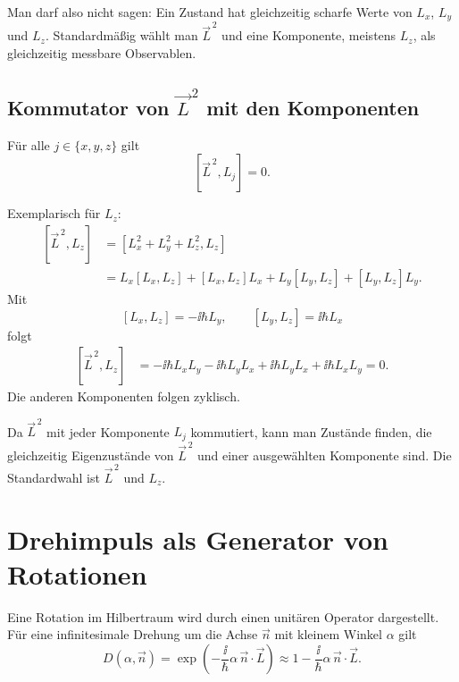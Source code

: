 \begin{warningbox}
Man darf also nicht sagen: Ein Zustand hat gleichzeitig scharfe Werte von \(L_x\), \(L_y\) und \(L_z\). Standardmäßig wählt man \(\vec L^{\,2}\) und eine Komponente, meistens \(L_z\), als gleichzeitig messbare Observablen.
\end{warningbox}

\subsection{Kommutator von \(\vec L^{\,2}\) mit den Komponenten}

\begin{satzbox}
Für alle \(j\in\{x,y,z\}\) gilt
\[
    [\vec L^{\,2},L_j]=0.
\]
\end{satzbox}

\begin{proofbox}
Exemplarisch für \(L_z\):
\[
\begin{aligned}
    [\vec L^{\,2},L_z]
    &= [L_x^2+L_y^2+L_z^2,L_z]\\
    &= L_x[L_x,L_z]+[L_x,L_z]L_x
     + L_y[L_y,L_z]+[L_y,L_z]L_y.
\end{aligned}
\]
Mit
\[
    [L_x,L_z]=-\ii\hbar L_y,
    \qquad
    [L_y,L_z]=\ii\hbar L_x
\]
folgt
\[
\begin{aligned}
    [\vec L^{\,2},L_z]
    &= -\ii\hbar L_xL_y-\ii\hbar L_yL_x
       +\ii\hbar L_yL_x+\ii\hbar L_xL_y=0.
\end{aligned}
\]
Die anderen Komponenten folgen zyklisch.
\end{proofbox}

\begin{conceptbox}
Da \(\vec L^{\,2}\) mit jeder Komponente \(L_j\) kommutiert, kann man Zustände finden, die gleichzeitig Eigenzustände von \(\vec L^{\,2}\) und einer ausgewählten Komponente sind. Die Standardwahl ist \(\vec L^{\,2}\) und \(L_z\).
\end{conceptbox}

\section{Drehimpuls als Generator von Rotationen}

Eine Rotation im Hilbertraum wird durch einen unitären Operator dargestellt. Für eine infinitesimale Drehung um die Achse \(\vec n\) mit kleinem Winkel \(\alpha\) gilt
\[
    D(\alpha,\vec n)
    =\exp\left(-\frac{\ii}{\hbar}\alpha\,\vec n\cdot\vec L\right)
    \approx 1-\frac{\ii}{\hbar}\alpha\,\vec n\cdot\vec L.
\]

